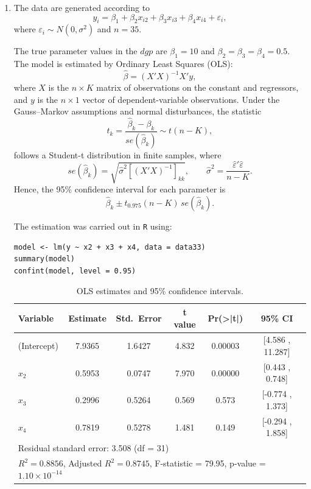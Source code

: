 \begin{enumerate}[label=(\roman*)]
    \item 

The data are generated according to
\[
y_i = \beta_1 + \beta_2 x_{i2} + \beta_3 x_{i3} + \beta_4 x_{i4} + \varepsilon_i,
\]
where $\varepsilon_i \sim N(0,\sigma^2)$ and $n = 35$.  

The true parameter values in the $dgp$ are $\beta_1 = 10$ and $\beta_2 = \beta_3 = \beta_4 = 0.5$. The model is estimated by Ordinary Least Squares (OLS):
\[
\hat{\beta} = (X'X)^{-1} X'y,
\]
where $X$ is the $n \times K$ matrix of observations on the constant and regressors, and $y$ is the $n \times 1$ vector of dependent-variable observations. Under the Gauss–Markov assumptions and normal disturbances, the statistic
\[
t_k = \frac{\hat{\beta}_k - \beta_k}{se(\hat{\beta}_k)} \sim t(n-K),
\]
follows a Student-t distribution in finite samples, where
\[
se(\hat{\beta}_k) = \sqrt{\hat{\sigma}^2[(X'X)^{-1}]_{kk}}, \qquad
\hat{\sigma}^2 = \frac{\hat{\varepsilon}'\hat{\varepsilon}}{n-K}.
\]
Hence, the 95\% confidence interval for each parameter is
\[
\hat{\beta}_k \pm t_{0.975}(n-K)\,se(\hat{\beta}_k).
\]

\noindent The estimation was carried out in \texttt{R} using:
\begin{verbatim}
model <- lm(y ~ x2 + x3 + x4, data = data33)
summary(model)
confint(model, level = 0.95)
\end{verbatim}

\begin{table}[H]
\centering
\caption{OLS estimates and 95\% confidence intervals.}
\begin{tabular}{lccccc}
\hline
Variable & Estimate & Std.\ Error & t value & Pr(>|t|) & 95\% CI \\ 
\hline
(Intercept) & 7.9365 & 1.6427 & 4.832 & 0.00003 & [4.586 , 11.287] \\
$x_{2}$ & 0.5953 & 0.0747 & 7.970 & 0.00000 & [0.443 , 0.748] \\
$x_{3}$ & 0.2996 & 0.5264 & 0.569 & 0.573 & [-0.774 , 1.373] \\
$x_{4}$ & 0.7819 & 0.5278 & 1.481 & 0.149 & [-0.294 , 1.858] \\
\hline
\multicolumn{6}{l}{\footnotesize Residual standard error: 3.508 (df = 31)}\\
\multicolumn{6}{l}{\footnotesize $R^2 = 0.8856$, Adjusted $R^2 = 0.8745$, F-statistic = 79.95, p-value = $1.10\times10^{-14}$}\\
\end{tabular}
\end{table}


\end{enumerate}
